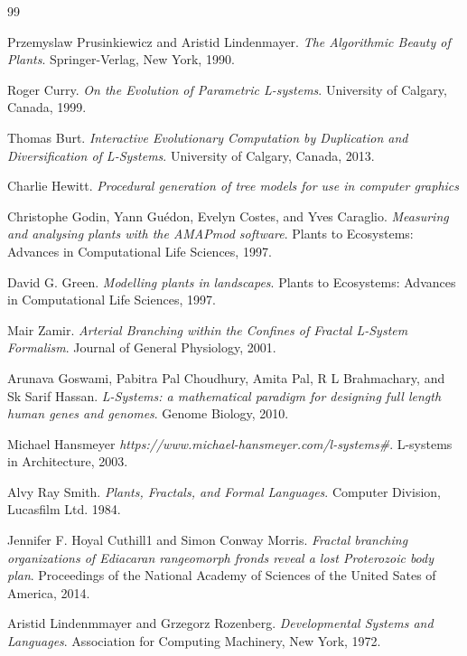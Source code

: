 \documentclass[]{final_report}
\begin{document}
\newpage
\begin{thebibliography}{99}

 Przemyslaw Prusinkiewicz and Aristid Lindenmayer. \emph{The Algorithmic Beauty of Plants}.  Springer-Verlag, New York, 1990.

 Roger Curry. \emph{On the Evolution of Parametric L-systems}. University of Calgary, Canada, 1999.

 Thomas Burt. \emph{Interactive Evolutionary Computation by Duplication and Diversification of L-Systems}. University of Calgary, Canada, 2013.

 Charlie Hewitt. \emph{Procedural generation of tree models for use in computer graphics}

 Christophe Godin, Yann Guédon, Evelyn Costes, and Yves Caraglio. \emph{Measuring and analysing plants with the AMAPmod software}. Plants to Ecosystems: Advances in Computational Life Sciences, 1997.

 David G. Green. \emph{Modelling plants in landscapes}. Plants to Ecosystems: Advances in Computational Life Sciences, 1997.

 Mair Zamir. \emph{Arterial Branching within the Confines of Fractal L-System Formalism}. Journal of General Physiology, 2001.

 Arunava Goswami, Pabitra Pal Choudhury, Amita Pal, R L Brahmachary, and Sk Sarif Hassan. \emph{L-Systems: a mathematical paradigm for designing full length human genes and genomes}. Genome Biology, 2010.

 Michael Hansmeyer \emph{https://www.michael-hansmeyer.com/l-systems\#}. L-systems in Architecture, 2003.

 Alvy Ray Smith. \emph{Plants, Fractals, and Formal Languages}. Computer Division, Lucasfilm Ltd. 1984.

 Jennifer F. Hoyal Cuthill1 and Simon Conway Morris. \emph{Fractal branching organizations of Ediacaran rangeomorph fronds reveal a lost Proterozoic body plan}. Proceedings of the National Academy of Sciences of the United Sates of America, 2014.

 Aristid Lindenmmayer and Grzegorz Rozenberg. \emph{Developmental Systems and Languages}. Association for Computing Machinery, New York, 1972.


\end{thebibliography}
\end{document}
